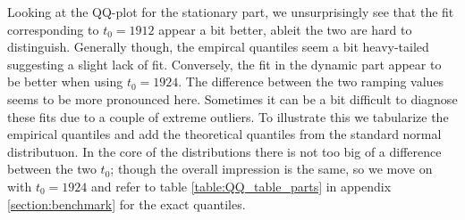 Looking at the QQ-plot for the stationary part, we unsurprisingly see that the fit corresponding to $t_0 = 1912$ appear a bit better, ableit the two are hard to distinguish. Generally though, the empircal quantiles seem a bit heavy-tailed suggesting a slight lack of fit. Conversely, the fit in the dynamic part appear to be better when using $t_0 = 1924$. The difference between the two ramping values seems to be more pronounced here. Sometimes it can be a bit difficult to diagnose these fits due to a couple of extreme outliers. To illustrate this we tabularize the empirical quantiles and add the theoretical quantiles from the standard normal distributuon. In the core of the distributions there is not too big of a difference between the two $t_0$; though the overall impression is the same, so we move on with $t_0 = 1924$ and refer to table \ref{table:QQ_table_parts} in appendix \ref{section:benchmark} for the exact quantiles.
